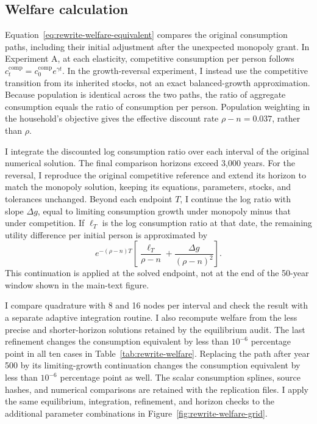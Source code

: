 \subsection{Welfare calculation}
\label{app:rewrite-welfare-numerics}

Equation~\eqref{eq:rewrite-welfare-equivalent} compares the original
consumption paths, including their initial adjustment after the
unexpected monopoly grant. In Experiment A, at each elasticity, competitive
consumption per person follows $c_t^{\mathrm{comp}}=c_0^{\mathrm{comp}}e^{\gamma t}$.
In the growth-reversal experiment, I instead use the competitive transition
from its inherited stocks, not an exact balanced-growth approximation.
Because population is identical across the two paths, the ratio of
aggregate consumption equals the ratio of consumption per person.
Population weighting in the household's objective gives the effective
discount rate $\rho-n=0.037$, rather than $\rho$.

I integrate the discounted log consumption ratio over each interval of
the original numerical solution. The final comparison horizons exceed
3,000 years. For the reversal, I reproduce the original competitive
reference and extend its horizon to match the monopoly solution, keeping
its equations, parameters, stocks, and tolerances unchanged.
Beyond each endpoint $T$, I continue the log ratio with slope $\Delta g$,
equal to limiting consumption growth under monopoly minus that under competition.
If $\ell_T$ is the log consumption ratio at that date, the remaining utility difference
per initial person is approximated by
\[
 e^{-(\rho-n)T}
 \left[\frac{\ell_T}{\rho-n}
 +\frac{\Delta g}{(\rho-n)^2}\right].
\]
This continuation is applied at the solved endpoint, not at the end of
the 50-year window shown in the main-text figure.

I compare quadrature with 8 and 16 nodes per interval and check the
result with a separate adaptive integration routine. I also recompute
welfare from the less precise and shorter-horizon solutions retained by
the equilibrium audit. The last refinement changes the
consumption equivalent by less than $10^{-6}$ percentage point in
all ten cases in Table~\ref{tab:rewrite-welfare}. Replacing the path after year 500 by its limiting-growth
continuation changes the consumption equivalent by less than $10^{-6}$ percentage point
as well. The scalar consumption splines, source hashes, and numerical
comparisons are retained with the replication files. I apply the same
equilibrium, integration, refinement, and horizon checks to the additional
parameter combinations in Figure~\ref{fig:rewrite-welfare-grid}.

